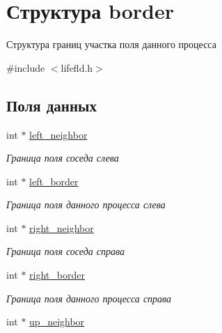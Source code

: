 \hypertarget{structborder}{}\section{Структура border}
\label{structborder}


Структура границ участка поля данного процесса  




{\ttfamily \#include $<$lifefld.\+h$>$}

\subsection*{Поля данных}
\begin{DoxyCompactItemize}
\item 
int $\ast$ \hyperlink{structborder_ad9180674bd187d2d03c1df75cfe09b5c}{left\+\_\+neighbor}\hypertarget{structborder_ad9180674bd187d2d03c1df75cfe09b5c}{}\label{structborder_ad9180674bd187d2d03c1df75cfe09b5c}

\begin{DoxyCompactList}\small\item\em Граница поля соседа слева \end{DoxyCompactList}\item 
int $\ast$ \hyperlink{structborder_aeeebec46746633e69355c0041c87a6ae}{left\+\_\+border}\hypertarget{structborder_aeeebec46746633e69355c0041c87a6ae}{}\label{structborder_aeeebec46746633e69355c0041c87a6ae}

\begin{DoxyCompactList}\small\item\em Граница поля данного процесса слева \end{DoxyCompactList}\item 
int $\ast$ \hyperlink{structborder_aba1475f2a488b21361600147af4a88d6}{right\+\_\+neighbor}\hypertarget{structborder_aba1475f2a488b21361600147af4a88d6}{}\label{structborder_aba1475f2a488b21361600147af4a88d6}

\begin{DoxyCompactList}\small\item\em Граница поля соседа справа \end{DoxyCompactList}\item 
int $\ast$ \hyperlink{structborder_a52e70a5be2f727a9687e12ef48f7ff3b}{right\+\_\+border}\hypertarget{structborder_a52e70a5be2f727a9687e12ef48f7ff3b}{}\label{structborder_a52e70a5be2f727a9687e12ef48f7ff3b}

\begin{DoxyCompactList}\small\item\em Граница поля данного процесса справа \end{DoxyCompactList}\item 
int $\ast$ \hyperlink{structborder_a517e3084650ac9f1b2082b166e0396e3}{up\+\_\+neighbor}\hypertarget{structborder_a517e3084650ac9f1b2082b166e0396e3}{}\label{structborder_a517e3084650ac9f1b2082b166e0396e3}


\end{DoxyCompactItemize}
